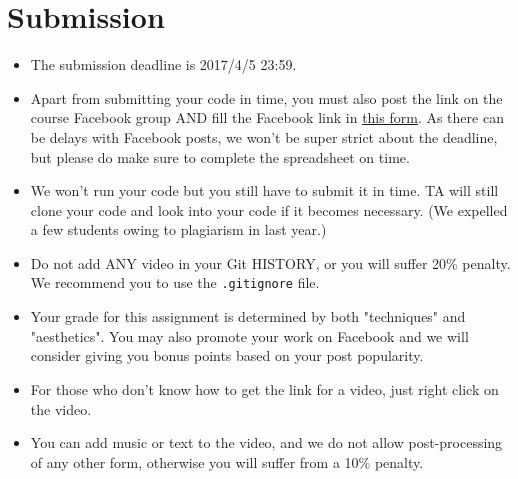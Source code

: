 \documentclass[12pt,a4paper]{article}
\begin{document}
\section{Submission}
\begin{itemize}
\item The submission deadline is 2017/4/5 23:59.
\item Apart from submitting your code in time,
you must also post the link on the course Facebook group
{\color{red}AND} fill the Facebook link in
\href{https://goo.gl/forms/iDL8aVlFyKXIRr2k1}{this form}.
As there can be delays with Facebook posts, we won't be super strict about the deadline, but please do make sure to complete the spreadsheet on time.
\item We won't run your code but you still have to submit it in time. TA will still clone your code and look into your code if it becomes necessary. (We expelled a few students owing to plagiarism in last year.)
\item Do not add ANY video in your Git HISTORY, or you will suffer 20\% penalty. We recommend you to use the \verb+.gitignore+ file.
\item Your grade for this assignment is determined by both "techniques" and "aesthetics". You may also promote your work on Facebook and we will consider giving you bonus points based on your post popularity.
\item For those who don't know how to get the link for a video, just right click on the video.
\item You can add music or text to the video, and we do not allow post-processing of any other form, otherwise you will suffer from a 10\% penalty.
\end{itemize}
\end{document}
